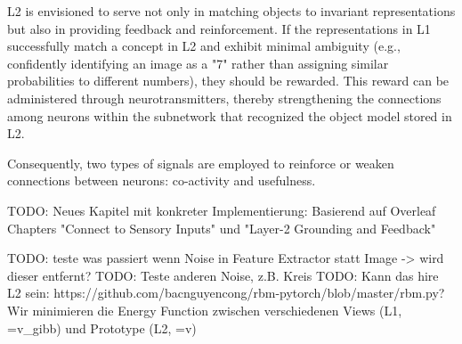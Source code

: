 L2 is envisioned to serve not only in matching objects to invariant representations but also in providing feedback and reinforcement. If the representations in L1 successfully match a concept in L2 and exhibit minimal ambiguity (e.g., confidently identifying an image as a "7" rather than assigning similar probabilities to different numbers), they should be rewarded. This reward can be administered through neurotransmitters, thereby strengthening the connections among neurons within the subnetwork that recognized the object model stored in L2.

Consequently, two types of signals are employed to reinforce or weaken connections between neurons: co-activity and usefulness.













TODO: Neues Kapitel mit konkreter Implementierung: Basierend auf Overleaf Chapters "Connect to Sensory Inputs" und "Layer-2 Grounding and Feedback"


TODO: teste was passiert wenn Noise in Feature Extractor statt Image -> wird dieser entfernt?
TODO: Teste anderen Noise, z.B. Kreis
TODO: Kann das hire L2 sein: https://github.com/bacnguyencong/rbm-pytorch/blob/master/rbm.py? Wir minimieren die Energy Function zwischen verschiedenen Views (L1, =v_gibb) und Prototype (L2, =v)






